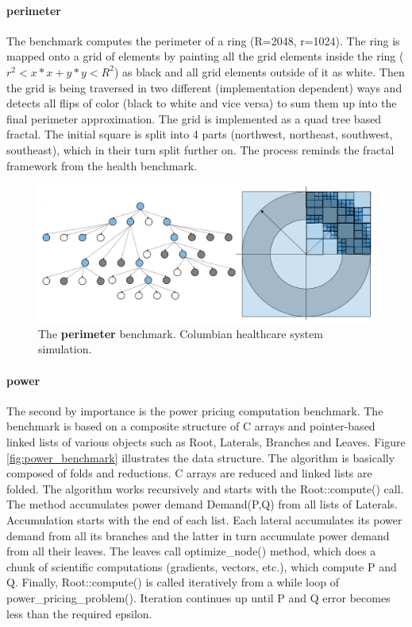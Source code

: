 \paragraph{perimeter} The benchmark computes the perimeter of a ring (R=2048, r=1024). The ring is mapped onto a grid of elements by painting all the grid elements inside the ring ($r^{2} < x*x + y*y < R^{2}$) as black and all grid elements outside of it as white. Then the grid is being traversed in two different (implementation dependent) ways and detects all flips of color (black to white and vice versa) to sum them up into the final perimeter approximation. The grid is implemented as a quad tree based fractal. The initial square is split into 4 parts (northwest, northeast, southwest, southeast), which in their turn split further on. The process reminds the fractal framework from the health benchmark.
\begin{figure}[ht]
\begin{center}
\includegraphics[width=1.0\textwidth]{images/perimeter_benchmark.png}
\caption{The \textbf{perimeter} benchmark. Columbian healthcare system simulation.}
\label{fig:health_benchmark}
\end{center}
\end{figure}
\paragraph{power} The second by importance is the power pricing computation benchmark. The benchmark is based on a composite structure of C arrays and pointer-based linked lists of various objects such as Root, Laterals, Branches and Leaves. Figure \ref{fig:power_benchmark} illustrates the data structure. The algorithm is basically composed of folds and reductions. C arrays are reduced and linked lists are folded. The algorithm works recursively and starts with the Root::compute() call. The method accumulates power demand
Demand(P,Q) from all lists of Laterals. Accumulation starts with the end of each list. Each lateral accumulates its power demand from all its branches and the latter in turn accumulate power demand from all their leaves. The leaves call
optimize\_node() method, which does a chunk of scientific computations (gradients, vectors, etc.), which compute P and Q. Finally, Root::compute() is called iteratively from a while
loop of power\_pricing\_problem(). Iteration continues up until P and Q error becomes less than the required epsilon. 
